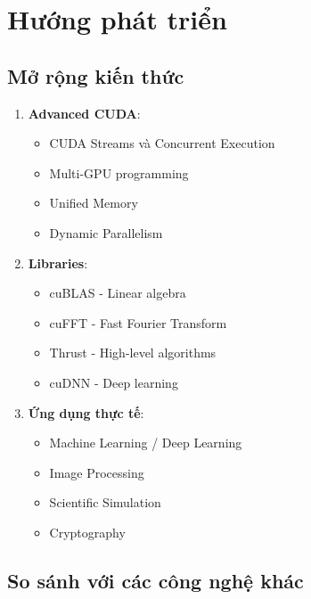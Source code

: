 \section{Hướng phát triển}

\subsection{Mở rộng kiến thức}

\begin{enumerate}
    \item \textbf{Advanced CUDA}:
    \begin{itemize}
        \item CUDA Streams và Concurrent Execution
        \item Multi-GPU programming
        \item Unified Memory
        \item Dynamic Parallelism
    \end{itemize}
    
    \item \textbf{Libraries}:
    \begin{itemize}
        \item cuBLAS - Linear algebra
        \item cuFFT - Fast Fourier Transform
        \item Thrust - High-level algorithms
        \item cuDNN - Deep learning
    \end{itemize}
    
    \item \textbf{Ứng dụng thực tế}:
    \begin{itemize}
        \item Machine Learning / Deep Learning
        \item Image Processing
        \item Scientific Simulation
        \item Cryptography
    \end{itemize}
\end{enumerate}

\subsection{So sánh với các công nghệ khác}

